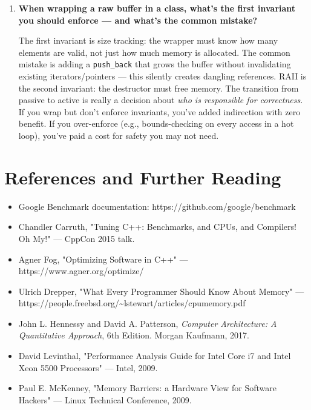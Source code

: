 \begin{enumerate}
\texttt{std::span} bundles a pointer + size into one value type, making it safe to pass by value (unlike raw pointers where the size is decoupled). Unlike iterators, it works with raw arrays, \texttt{std::vector}, \texttt{std::array}, and C arrays uniformly --- no template bloat. The key insight: \texttt{std::span} lets you write a function \emph{once} and call it with any contiguous range, including stack-allocated arrays. This eliminates the common pattern of needing overloads for \texttt{vector<T>} and \texttt{T*}. In modern C++, \texttt{std::span<const T>} is the idiomatic parameter type for ``read-only contiguous data'' --- it's the non-owning equivalent of \texttt{std::vector<T>}.

\item \textbf{When wrapping a raw buffer in a class, what's the first invariant you should enforce --- and what's the common mistake?}

The first invariant is size tracking: the wrapper must know how many elements are valid, not just how much memory is allocated. The common mistake is adding a \texttt{push\_back} that grows the buffer without invalidating existing iterators/pointers --- this silently creates dangling references. RAII is the second invariant: the destructor must free memory. The transition from passive to active is really a decision about \emph{who is responsible for correctness}. If you wrap but don't enforce invariants, you've added indirection with zero benefit. If you over-enforce (e.g., bounds-checking on every access in a hot loop), you've paid a cost for safety you may not need.
\end{enumerate}

\section{References and Further Reading}

\begin{itemize}
\item Google Benchmark documentation: https://github.com/google/benchmark
\item Chandler Carruth, "Tuning C++: Benchmarks, and CPUs, and Compilers! Oh My!" — CppCon 2015 talk.
\item Agner Fog, "Optimizing Software in C++" — https://www.agner.org/optimize/
\item Ulrich Drepper, "What Every Programmer Should Know About Memory" — https://people.freebsd.org/\textasciitilde{}lstewart/articles/cpumemory.pdf
\item John L. Hennessy and David A. Patterson, \textit{Computer Architecture: A Quantitative Approach}, 6th Edition. Morgan Kaufmann, 2017.
\item David Levinthal, "Performance Analysis Guide for Intel Core i7 and Intel Xeon 5500 Processors" — Intel, 2009.
\item Paul E. McKenney, "Memory Barriers: a Hardware View for Software Hackers" — Linux Technical Conference, 2009.
\end{itemize}

